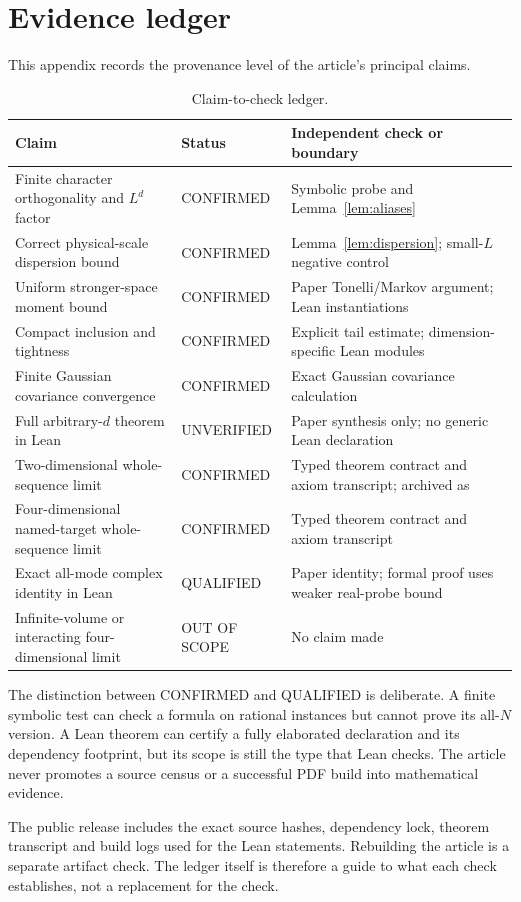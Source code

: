 \section{Evidence ledger}\label{sec:ledger}
This appendix records the provenance level of the article's principal claims.
\begin{table}[!ht]
\caption{Claim-to-check ledger.}\label{tab:ledger}
\centering
\begin{tabular}{@{}p{}p{}p{}@{}}
\toprule
Claim & Status & Independent check or boundary\\
\midrule
Finite character orthogonality and $L^d$ factor & CONFIRMED & Symbolic probe and Lemma~\ref{lem:aliases}\\
Correct physical-scale dispersion bound & CONFIRMED & Lemma~\ref{lem:dispersion}; small-$L$ negative control\\
Uniform stronger-space moment bound & CONFIRMED & Paper Tonelli/Markov argument; Lean instantiations\\
Compact inclusion and tightness & CONFIRMED & Explicit tail estimate; dimension-specific Lean modules\\
Finite Gaussian covariance convergence & CONFIRMED & Exact Gaussian covariance calculation\\
Full arbitrary-$d$ theorem in Lean & UNVERIFIED & Paper synthesis only; no generic Lean declaration\\
Two-dimensional whole-sequence limit & CONFIRMED & Typed theorem contract and axiom transcript; archived as~\cite{aiXiv2D}\\
Four-dimensional named-target whole-sequence limit & CONFIRMED & Typed theorem contract and axiom transcript\\
Exact all-mode complex identity in Lean & QUALIFIED & Paper identity; formal proof uses weaker real-probe bound\\
Infinite-volume or interacting four-dimensional limit & OUT OF SCOPE & No claim made\\
\bottomrule
\end{tabular}
\end{table}

The distinction between CONFIRMED and QUALIFIED is deliberate. A finite
symbolic test can check a formula on rational instances but cannot prove its
all-$N$ version. A Lean theorem can certify a fully elaborated declaration
and its dependency footprint, but its scope is still the type that Lean
checks. The article never promotes a source census or a successful PDF build
into mathematical evidence.

The public release includes the exact source hashes, dependency lock, theorem
transcript and build logs used for the Lean statements. Rebuilding the article
is a separate artifact check. The ledger itself is therefore a guide to what
each check establishes, not a replacement for the check.
